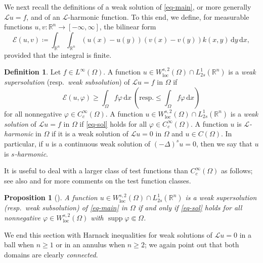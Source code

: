 \documentclass[11pt]{amsart}
\theoremstyle{plain}
\newtheorem{proposition}[theorem]{Proposition}
\theoremstyle{definition}
\newtheorem{definition}[theorem]{Definition}
\numberwithin{equation}{section}
\DeclareMathOperator{\supp}{supp}
\begin{document}
We next recall the definitions of a weak solution of \eqref{eq-main}, or more generally $\mathcal{L}u=f$, and of an $\mathcal{L}$-harmonic function. To this end, we define, for measurable functions $u, v: \mathbb{R}^n \to [-\infty, \infty]$, the bilinear form
\begin{equation*}
\mathcal{E}(u,v)\coloneqq\int_{\mathbb{R}^n} \int_{\mathbb{R}^n} (u(x)-u(y))(v(x)-v(y)) k(x, y) \,\mathrm{d}y\,\mathrm{d}x,
\end{equation*}
provided that the integral is finite.

\begin{definition}\label{def-harmonic}
Let $f \in L^{\infty}(\Omega)$. A function $u \in W^{s, 2}_{\mathrm{loc}}(\Omega) \cap L^{1}_{2s}(\mathbb{R}^n)$ is a {\it weak supersolution} (resp.\ \emph{weak subsolution}) of $\mathcal{L}u=f$ in $\Omega$ if
\begin{equation}\label{eq-sol}
\mathcal{E}(u, \varphi) \geq \int_\Omega f\varphi \,\mathrm{d}x ~\left(\text{resp.} \leq  \int_\Omega f\varphi \,\mathrm{d}x\right)
\end{equation}
for all nonnegative $\varphi \in C^\infty_c(\Omega)$. A function $u \in W^{s, 2}_{\mathrm{loc}}(\Omega) \cap L^{1}_{2s}(\mathbb{R}^n)$ is a {\it weak solution} of $\mathcal{L}u=f$ in $\Omega$ if \eqref{eq-sol} holds for all $\varphi \in C^\infty_c(\Omega)$. A function $u$ is \emph{$\mathcal{L}$-harmonic} in $\Omega$ if it is a weak solution of $\mathcal{L}u=0$ in $\Omega$ and $u \in C(\Omega)$. In particular, if $u$ is a continuous weak solution of $(-\Delta)^su=0$, then we say that $u$ is \emph{$s$-harmonic}.
\end{definition}

It is useful to deal with a larger class of test functions than $C^\infty_c(\Omega)$ as follows; see also \cite[Section~2]{KL25} and \cite[Section~2]{BBK24} for more comments on the test function classes.

\begin{proposition}[{\cite[Proposition~2.6]{KL24}}]\label{prop-test}
A function $u\in W^{s, 2}_{\mathrm{loc}}(\Omega) \cap L^{1}_{2s}(\mathbb{R}^n)$  is a weak supersolution (resp.\ weak subsolution) of \eqref{eq-main} in $\Omega$ if and only if \eqref{eq-sol} holds for all nonnegative $\varphi \in W^{s, 2}_{\mathrm{loc}}(\Omega)$ with $\supp{\varphi}\Subset \Omega$.
\end{proposition}

We end this section with Harnack inequalities for weak solutions of $\mathcal{L}u=0$ in a ball when $n \geq 1$ or in an annulus when $n \geq 2$; we again point out that both domains are clearly \emph{connected}.
\end{document}
